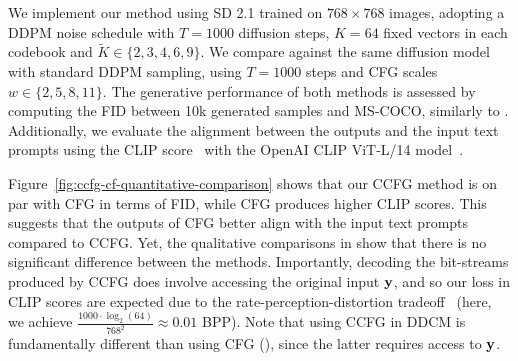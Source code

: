 We implement our method using SD 2.1 trained on $768\times768$ images, adopting a DDPM noise schedule with $T=1000$ diffusion steps, $K=64$ fixed vectors in each codebook and $\tilde{K}\in\{2,3,4,6,9\}$.
We compare against the same diffusion model with standard DDPM sampling, using $T=1000$ steps and CFG scales $w\in\{2,5,8,11\}$.
The generative performance of both methods is assessed by computing the FID between 10k generated samples and MS-COCO, similarly to .
Additionally, we evaluate the alignment between the outputs and the input text prompts using the CLIP score~\citep{hessel2021clipscore} with the OpenAI CLIP ViT-L/14 model~\citep{pmlr-v139-radford21a}.

Figure~\ref{fig:ccfg-cf-quantitative-comparison} shows that our CCFG method is on par with CFG in terms of FID, while CFG produces higher CLIP scores.
This suggests that the outputs of CFG better align with the input text prompts compared to CCFG.
Yet, the qualitative comparisons in  show that there is no significant difference between the methods.
Importantly, decoding the bit-streams produced by CCFG does involve accessing the original input ${\mathbf{y}}$, and so our loss in CLIP scores are expected due to the rate-perception-distortion tradeoff~\citep{pmlr-v97-blau19a} (here, we achieve $\frac{1000\cdot\log_{2}(64)}{768^2}\approx 0.01$ BPP).
Note that using CCFG in DDCM is fundamentally different than using CFG (), since the latter requires access to ${\mathbf{y}}$.